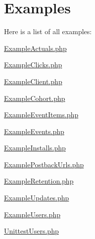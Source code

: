 \section{Examples}
Here is a list of all examples\-:\begin{DoxyCompactItemize}
\item 
\hyperlink{ExampleActuals_8php-example}{Example\-Actuals.\-php}
\item 
\hyperlink{ExampleClicks_8php-example}{Example\-Clicks.\-php}
\item 
\hyperlink{ExampleClient_8php-example}{Example\-Client.\-php}
\item 
\hyperlink{ExampleCohort_8php-example}{Example\-Cohort.\-php}
\item 
\hyperlink{ExampleEventItems_8php-example}{Example\-Event\-Items.\-php}
\item 
\hyperlink{ExampleEvents_8php-example}{Example\-Events.\-php}
\item 
\hyperlink{ExampleInstalls_8php-example}{Example\-Installs.\-php}
\item 
\hyperlink{ExamplePostbackUrls_8php-example}{Example\-Postback\-Urls.\-php}
\item 
\hyperlink{ExampleRetention_8php-example}{Example\-Retention.\-php}
\item 
\hyperlink{ExampleUpdates_8php-example}{Example\-Updates.\-php}
\item 
\hyperlink{ExampleUsers_8php-example}{Example\-Users.\-php}
\item 
\hyperlink{UnittestUsers_8php-example}{Unittest\-Users.\-php}
\end{DoxyCompactItemize}
